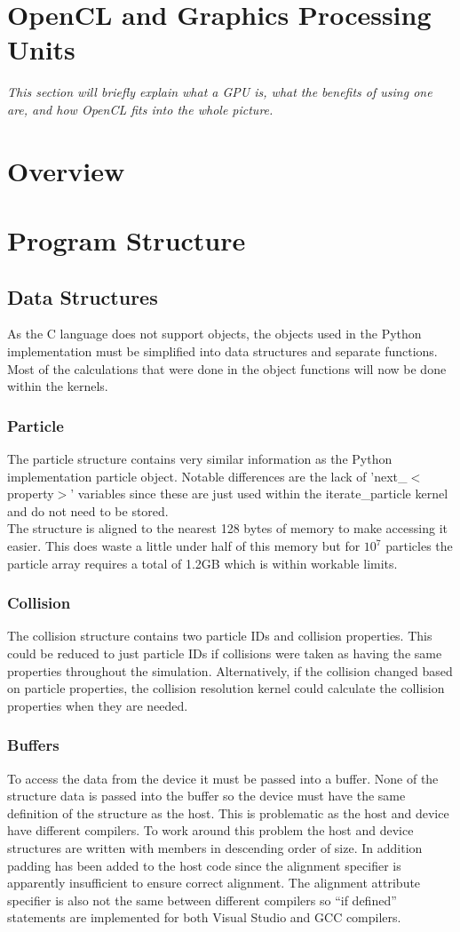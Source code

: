 \documentclass[10pt,a4paper,titlepage]{report}
\begin{document}
\section{OpenCL and Graphics Processing Units}
\textit{This section will briefly explain what a GPU is, what the benefits of using one are, and how OpenCL fits into the whole picture.}
\section{Overview}
\section{Program Structure}
\subsection{Data Structures}
As the C language does not support objects, the objects used in the Python implementation must be simplified into data structures and separate functions. Most of the calculations that were done in the object functions will now be done within the kernels.
\subsubsection{Particle}
The particle structure contains very similar information as the Python implementation particle object. Notable differences are the lack of 'next\_$<$property$>$' variables since these are just used within the iterate\_particle kernel and do not need to be stored.
\\The structure is aligned to the nearest 128 bytes of memory to make accessing it easier. This does waste a little under half of this memory but for $10^7$ particles the particle array requires a total of 1.2GB which is within workable limits.
\subsubsection{Collision}
The collision structure contains two particle IDs and collision properties. This could be reduced to just particle IDs if collisions were taken as having the same properties throughout the simulation. Alternatively, if the collision changed based on particle properties, the collision resolution kernel could calculate the collision properties when they are needed.
\subsubsection{Buffers}
To access the data from the device it must be passed into a buffer. None of the structure data is passed into the buffer so the device must have the same definition of the structure as the host. This is problematic as the host and device have different compilers. To work around this problem the host and device structures are written with members in descending order of size. In addition padding has been added to the host code %
 since the alignment specifier is apparently insufficient to ensure correct alignment. The alignment attribute specifier is also not the same between different compilers so ``if defined'' statements are implemented for both Visual Studio and GCC compilers.
\end{document}
